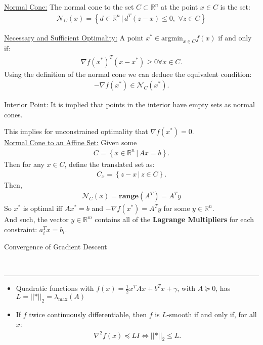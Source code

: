 \documentclass{article}
\newcommand{\header}[1]{\begin{large}\noindent #1\end{large}\\\rule{\textwidth}{0.5pt}}
\newcommand{\norm}[2]{\left\lvert\left\lvert#1\right\rvert\right\rvert}
\newcommand{\sheader}[1]{\underline{#1:}}
\newcommand{\gap}{\medskip\\}
\newcommand{\curly}[1]{\left\{#1\right\}}
\begin{document}
\sheader{Normal Cone} The normal cone to the set $C \subset \mathbb{R}^n$
at the point $x \in C$ is the set:
\begin{align*}
    \mathcal{N}_C(x) = \curly{d \in \mathbb{R}^n \,|\, d^T(z-x) \leq 0, \,\, \forall z \in C}
\end{align*}

\sheader{Necessary and Sufficient Optimality}
A point $x^* \in \textrm{argmin}_{x\in C} f(x)$ if and only if:
\begin{align*}
    \nabla f(x^*)^T (x- x^*)\geq 0 \forall x \in C.
\end{align*}
Using the definition of the normal cone we can deduce the equivalent condition:
\begin{align*}
    -\nabla f(x^*) \in \mathcal{N}_C(x^*).
\end{align*}

\sheader{Interior Point} It is implied that points in the interior 
have empty sets as normal cones.

This implies for unconstrained optimality that $\nabla f(x^*) = 0$.
\gap
\sheader{Normal Cone to an Affine Set} Given some 
\begin{align*}
    C = \curly{x \in \mathbb{R}^n \,|\, Ax = b}.
\end{align*}
Then for any $x \in C$, define the translated set as:
\begin{align*}
    C_x = \curly{z - x \,|\, z \in C}.
\end{align*}
Then,
\begin{align*}
    \mathcal{N}_C(x) = \mathbf{range}(A^T) = A^Ty
\end{align*}
So $x^*$ is optimal iff $Ax^* = b$ and $-\nabla f(x^*) = A^Ty$ for some 
$y \in \mathbb{R}^n$.
\gap
And such, the vector $y \in \mathbb{R}^m$ contains all of the 
\textbf{Lagrange Multipliers} for each constraint: $a_i^Tx = b_i$.
\gap
\header{Convergence of Gradient Descent}
\begin{itemize}
    \item Quadratic functions with $f(x) = \frac{1}{2}x^TAx + b^Tx + \gamma$,
    with $A \succeq 0$, has $L = \norm*{A}_2 = \lambda_{\textrm{max}}(A)$
    \item If $f$ twice continuously differentiable, then $f$ is $L$-smooth
    if and only if, for all $x$:
    \begin{align*}
        \nabla^2f(x)\preceq LI \iff \norm*{\nabla^2 f(x)}_2 \leq L.
    \end{align*}
\end{itemize}
\end{document}
